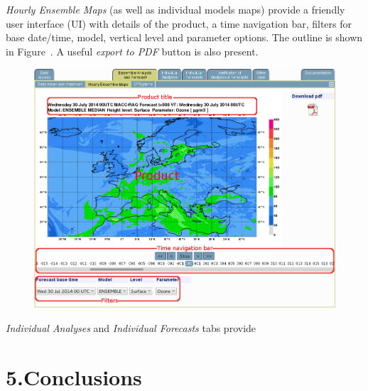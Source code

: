 \documentclass[9pt]{report}
\begin{document}
\noindent{}\emph{Hourly Ensemble Maps} (as well as individual models maps) provide a friendly user interface (UI) with details of the product, a time navigation bar, filters for base date/time, model, vertical level and parameter options.
The outline is shown in Figure~. A useful \emph{export to PDF} button is also present.%

\begin{figure}[h!]%
\begin{mdcenter}%

\noindent{}\includegraphics[keepaspectratio=true,width=\dimmin{}{\dimwidth{0.90}}]{images/regional_map_details}{}%

\mdhr{}%

\noindent{}%
\end{mdcenter}\label{regional-map-details}%
\end{figure}%

\noindent{}\emph{Individual Analyses} and \emph{Individual Forecasts} tabs provide%

\section{5.\hspace*{0.5em}Conclusions}\label{sec-conclusions}%
\end{document}
